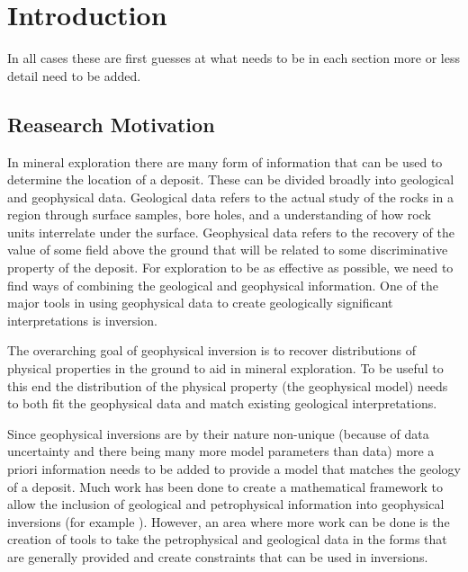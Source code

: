 
\chapter{Introduction}
\label{ch:Introduction}

\begin{epigraph}
\end{epigraph}

In all cases these are first guesses at what needs to be in each section more or less detail need to be added.

\section{Reasearch Motivation}
\label{sec:Reasearch Motivation}

In mineral exploration there are many form of information that can be used to determine the location of a deposit. These can be divided broadly into geological and geophysical data. Geological data refers to the actual study of the rocks in a region through surface samples, bore holes, and a understanding of how rock units interrelate under the surface. Geophysical data refers to the recovery of the value of some field above the ground that will be related to some discriminative property of the deposit. For exploration to be as effective as possible, we need to find ways of combining the geological and geophysical information. One of the major tools in using geophysical data to create geologically significant interpretations is inversion.

The overarching goal of geophysical inversion is to recover distributions of physical properties in the ground to aid in mineral exploration. To be useful to this end the distribution of the physical property (the geophysical model) needs to both fit the geophysical data and match existing geological interpretations. 

Since geophysical inversions are by their nature non-unique (because of data uncertainty and there being many more model parameters than data) more a priori information needs to be added to provide a model that matches the geology of a deposit. Much work has been done to create a mathematical framework to allow the inclusion of geological and petrophysical information into geophysical inversions (for example \cite{li19963}). However, an area where more work can be done is the creation of tools to take the petrophysical and geological data in the forms that are generally provided and create constraints that can be used in inversions.

